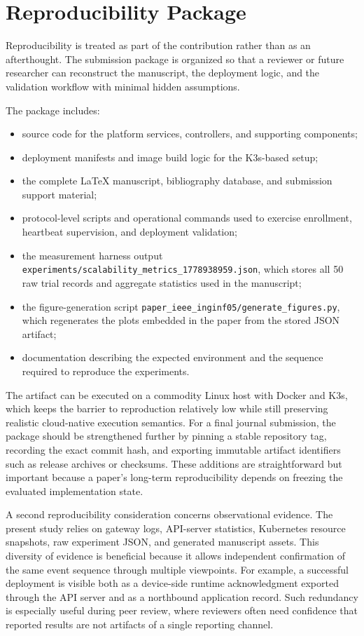 \section{Reproducibility Package}

Reproducibility is treated as part of the contribution rather than as an afterthought. The submission package is organized so that a reviewer or future researcher can reconstruct the manuscript, the deployment logic, and the validation workflow with minimal hidden assumptions.

The package includes:
\begin{itemize}
    \item source code for the platform services, controllers, and supporting components;
    \item deployment manifests and image build logic for the K3s-based setup;
    \item the complete LaTeX manuscript, bibliography database, and submission support material;
    \item protocol-level scripts and operational commands used to exercise enrollment, heartbeat supervision, and deployment validation;
    \item the measurement harness output \texttt{experiments/scalability\_metrics\_1778938959.json}, which stores all 50 raw trial records and aggregate statistics used in the manuscript;
    \item the figure-generation script \texttt{paper\_ieee\_inginf05/generate\_figures.py}, which regenerates the plots embedded in the paper from the stored JSON artifact;
    \item documentation describing the expected environment and the sequence required to reproduce the experiments.
\end{itemize}

The artifact can be executed on a commodity Linux host with Docker and K3s, which keeps the barrier to reproduction relatively low while still preserving realistic cloud-native execution semantics. For a final journal submission, the package should be strengthened further by pinning a stable repository tag, recording the exact commit hash, and exporting immutable artifact identifiers such as release archives or checksums. These additions are straightforward but important because a paper's long-term reproducibility depends on freezing the evaluated implementation state.

A second reproducibility consideration concerns observational evidence. The present study relies on gateway logs, API-server statistics, Kubernetes resource snapshots, raw experiment JSON, and generated manuscript assets. This diversity of evidence is beneficial because it allows independent confirmation of the same event sequence through multiple viewpoints. For example, a successful deployment is visible both as a device-side runtime acknowledgment exported through the API server and as a northbound application record. Such redundancy is especially useful during peer review, where reviewers often need confidence that reported results are not artifacts of a single reporting channel.

